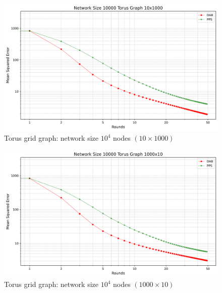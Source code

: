 \begin{figure}[H]
    \centering
    \includegraphics[scale=0.5]{figures/torusGridGraphSimulations/10x1000/DAB_vs_PPS_TG_r50_n10000.png}
    \caption{Torus grid graph: network size $10^{4}$ nodes $(10 \times 1000)$}
    \label{fig:10x1000Torusgraph}
\end{figure}
\begin{figure}[H]
    \centering
    \includegraphics[scale=0.5]{figures/torusGridGraphSimulations/1000x10/DAB_vs_PPS_TG_r50_n10000.png}
    \caption{Torus grid graph: network size $10^{4}$ nodes $(1000 \times 10)$}
    \label{fig:1000x10Torusgraph}
\end{figure}

